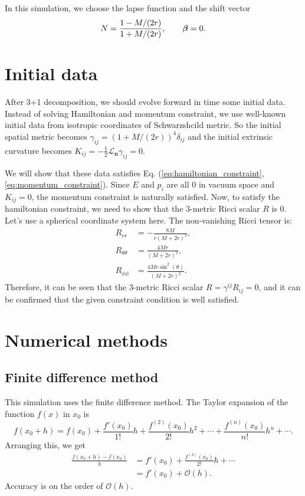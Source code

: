 In this simulation, we choose the lapse function and the shift vector
\begin{equation}
	N = \frac{1-M/(2r)}{1+M/(2r)}, \qquad \bm{\beta} = 0.
\end{equation}

\section{Initial data}
After 3+1 decomposition, we should evolve forward in time some initial data. Instead of solving Hamiltonian and momentum constraint, we use well-known initial data from isotropic coordinates of Schwarzshcild metric. So the initial spatial metric becomes $\gamma_{ij}=(1+M/(2r))^4\delta_{ij}$ and the initial extrinsic curvature becomes $K_{ij} = -\frac{1}{2}\mathcal{L}_{\bm{n}}\gamma_{ij} = 0$.

We will show that these data satisfies Eq. (\ref{eq:hamiltonian_constraint}, \ref{eq:momentum_constraint}). Since $E$ and $p_i$ are all $0$ in vacuum space and $K_{ij}=0$, the momentum constraint is naturally satisfied. Now, to satisfy the hamiltonian constraint, we need to show that the 3-metric Ricci scalar $R$ is $0$. Let's use a spherical coordinate system here. The non-vanishing Ricci tensor is:
\begin{align}
	R_{rr} &= - \frac{8 M}{r \left(M + 2 r\right)^{2}},\\
	R_{\theta\theta} &= \frac{4 M r}{\left(M + 2 r\right)^{2}},\\
	R_{\phi\phi} &= \frac{4 M r \sin^{2}{\left(\theta \right)}}{\left(M + 2 r\right)^{2}}.
\end{align}
Therefore, it can be seen that the 3-metric Ricci scalar $R = \gamma^{ij}R_{ij} = 0$, and it can be confirmed that the given constraint condition is well satisfied.

\section{Numerical methods}
\subsection{Finite difference method}
This simulation uses the finite difference method. The Taylor expansion of the function $f(x)$ in $x_0$ is
\begin{equation}
	f(x_0 + h) = f(x_0) + \frac{f'(x_0)}{1!}h + \frac{f^{(2)}(x_0)}{2!}h^2 + \cdots + \frac{f^{(n)}(x_0)}{n!}h^n+ \cdots .
\end{equation}
Arranging this, we get
\begin{equation}
	\begin{aligned}
		\frac{f(x_0 + h) - f(x_0)}{h} &= f'(x_0) + \frac{f^{(2)}(x_0)}{2!}h + \cdots \\
		&= f'(x_0) + \mathcal{O}(h).
	\end{aligned}
\end{equation}
Accuracy is on the order of $\mathcal{O}(h)$.

